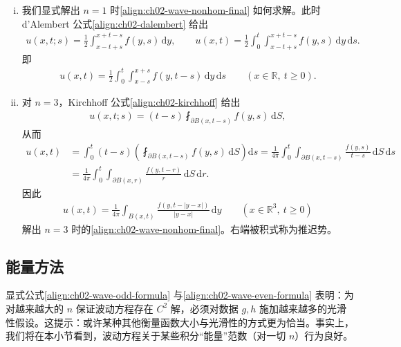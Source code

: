 \documentclass[../../main.tex]{subfiles}
\begin{document}
\begin{example}\label{example:ch02-wave-nonhom}
\begin{enumerate}[(i)]
\item 我们显式解出 $n=1$ 时\eqref{align:ch02-wave-nonhom-final} 如何求解。此时 d'Alembert 公式\eqref{align:ch02-dalembert} 给出
\begin{align*}
u(x,t;s)=\frac{1}{2}\int_{x-t+s}^{x+t-s}f(y,s)\,\mathrm{d}y,\qquad
u(x,t)=\frac{1}{2}\int_0^t\int_{x-t+s}^{x+t-s}f(y,s)\,\mathrm{d}y\,\mathrm{d}s.
\end{align*}
即
\begin{align}\label{align:ch02-wave-nonhom-1d}
u(x,t)=\frac{1}{2}\int_0^t\int_{x-s}^{x+s}f(y,t-s)\,\mathrm{d}y\,\mathrm{d}s \qquad (x\in\mathbb{R},\ t\geqslant 0).
\end{align}
\item 对 $n=3$，Kirchhoff 公式\eqref{align:ch02-kirchhoff} 给出
\begin{align*}
u(x,t;s)=(t-s)\fint_{\partial B(x,t-s)}f(y,s)\,\mathrm{d}S,
\end{align*}
从而
\begin{align*}
u(x,t)&=\int_0^t(t-s)\left(\fint_{\partial B(x,t-s)}f(y,s)\,\mathrm{d}S\right)\mathrm{d}s
=\frac{1}{4\pi}\int_0^t\int_{\partial B(x,t-s)}\frac{f(y,s)}{t-s}\,\mathrm{d}S\,\mathrm{d}s\\
&=\frac{1}{4\pi}\int_0^t\int_{\partial B(x,r)}\frac{f(y,t-r)}{r}\,\mathrm{d}S\,\mathrm{d}r.
\end{align*}
因此
\begin{align}\label{align:ch02-retarded}
u(x,t)=\frac{1}{4\pi}\int_{B(x,t)}\frac{f(y,t-|y-x|)}{|y-x|}\,\mathrm{d}y \qquad (x\in\mathbb{R}^3,\ t\geqslant 0)
\end{align}
解出 $n=3$ 时的\eqref{align:ch02-wave-nonhom-final}。右端被积式称为推迟势。
\end{enumerate}
\end{example}

\subsection{能量方法}\label{subsection:ch02-wave-energy}

显式公式\eqref{align:ch02-wave-odd-formula} 与\eqref{align:ch02-wave-even-formula} 表明：为对越来越大的 $n$ 保证波动方程存在 $C^2$ 解，必须对数据 $g,h$ 施加越来越多的光滑性假设。这提示：或许某种其他衡量函数大小与光滑性的方式更为恰当。事实上，我们将在本小节看到，波动方程关于某些积分``能量''范数（对一切 $n$）行为良好。
\end{document}
